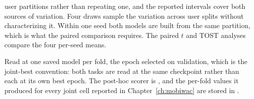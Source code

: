 \begin{description}
        user partitions rather than repeating one, and the reported intervals cover both
        sources of variation. Four draws sample the variation across user splits without
        characterizing it. Within one seed both models are built from the same partition, which is what
        the paired comparison requires. The paired $t$ and TOST analyses compare the four
        per-seed means.
  \item[The reported scores.] Read at one saved model per fold, the epoch selected on
        validation, which is the joint-best convention: both tasks are read at the same
        checkpoint rather than each at its own best epoch. The post-hoc scorer is
        , and the per-fold values it produced for
        every joint cell reported in Chapter~\ref{ch:mobiwac} are stored in
        .

\end{description}
